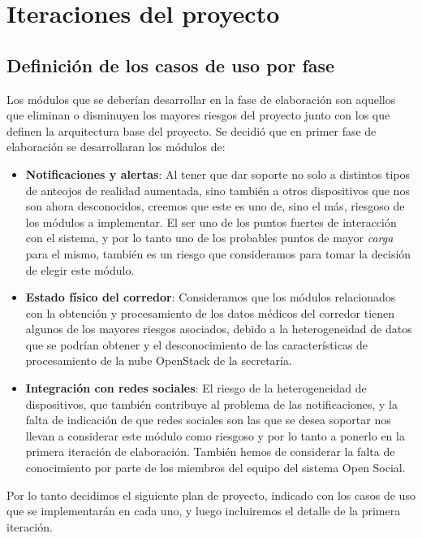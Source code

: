 \section{Iteraciones del proyecto}

\subsection{Definición de los casos de uso por fase}

Los módulos que se deberían desarrollar en la fase de elaboración son
aquellos que eliminan o disminuyen los mayores riesgos del proyecto
junto con los que definen la arquitectura base del proyecto. Se decidió
que en primer fase de elaboración se desarrollaran los módulos de:

\begin{itemize}
\itemsep1pt\parskip0pt
\item
  \textbf{Notificaciones y alertas}: Al tener que dar soporte no solo a
  distintos tipos de anteojos de realidad aumentada, sino también a
  otros dispositivos que nos son ahora desconocidos, creemos que este es
  uno de, sino el más, riesgoso de los módulos a implementar. El ser uno
  de los puntos fuertes de interacción con el sistema, y por lo tanto
  uno de los probables puntos de mayor \emph{carga} para el mismo,
  también es un riesgo que consideramos para tomar la decisión de elegir
  este módulo.
\item
  \textbf{Estado físico del corredor}: Consideramos que los módulos
  relacionados con la obtención y procesamiento de los datos médicos del
  corredor tienen algunos de los mayores riesgos asociados, debido a la
  heterogeneidad de datos que se podrían obtener y el desconocimiento de
  las características de procesamiento de la nube OpenStack de la
  secretaría.
\item
  \textbf{Integración con redes sociales}: El riesgo de la
  heterogeneidad de dispositivos, que también contribuye al problema de
  las notificaciones, y la falta de indicación de que redes sociales son
  las que se desea soportar nos llevan a considerar este módulo como
  riesgoso y por lo tanto a ponerlo en la primera iteración de
  elaboración. También hemos de considerar la falta de conocimiento por
  parte de los miembros del equipo del sistema Open Social.
\end{itemize}

Por lo tanto decidimos el siguiente plan de proyecto, indicado con los
casos de uso que se implementarán en cada uno, y luego incluiremos el
detalle de la primera iteración.


